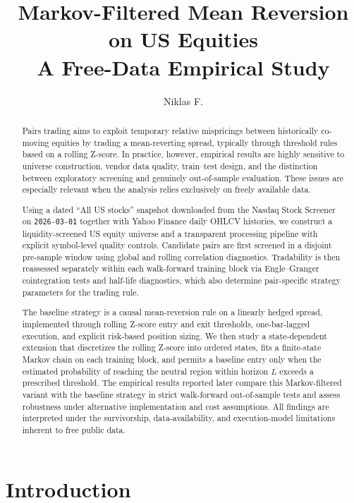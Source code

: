\documentclass[11pt,a4paper]{article}
\title{Markov-Filtered Mean Reversion on US Equities\\\small A Free-Data Empirical Study}
\author{Niklas F.}
\date{}
\begin{document}
\maketitle
\begin{abstract}
Pairs trading aims to exploit temporary relative mispricings between historically co-moving equities by trading a mean-reverting spread, typically through threshold rules based on a rolling Z-score. In practice, however, empirical results are highly sensitive to universe construction, vendor data quality, train--test design, and the distinction between exploratory screening and genuinely out-of-sample evaluation. These issues are especially relevant when the analysis relies exclusively on freely available data.

Using a dated ``All US stocks'' snapshot downloaded from the Nasdaq Stock Screener on \texttt{2026-03-01} together with Yahoo Finance daily OHLCV histories, we construct a liquidity-screened US equity universe and a transparent processing pipeline with explicit symbol-level quality controls. Candidate pairs are first screened in a disjoint pre-sample window using global and rolling correlation diagnostics. Tradability is then reassessed separately within each walk-forward training block via Engle--Granger cointegration tests and half-life diagnostics, which also determine pair-specific strategy parameters for the trading rule.

The baseline strategy is a causal mean-reversion rule on a linearly hedged spread, implemented through rolling Z-score entry and exit thresholds, one-bar-lagged execution, and explicit risk-based position sizing. We then study a state-dependent extension that discretizes the rolling Z-score into ordered states, fits a finite-state Markov chain on each training block, and permits a baseline entry only when the estimated probability of reaching the neutral region within horizon \(L\) exceeds a prescribed threshold. The empirical results reported later compare this Markov-filtered variant with the baseline strategy in strict walk-forward out-of-sample tests and assess robustness under alternative implementation and cost assumptions. All findings are interpreted under the survivorship, data-availability, and execution-model limitations inherent to free public data.
\end{abstract}

\section{Introduction}
\end{document}
